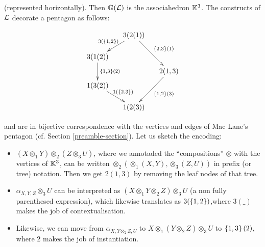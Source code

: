  \noindent
 (represented horizontally).  Then ${\mathbb G}({\cal L})$ is the associahedron ${\mathbb K}^3$. The constructs of
  ${\cal L}$ decorate a pentagon as follows:

\begin{center}
$$\xymatrix @-1.65pc {&& 3(2(1)) \ar @{->}[ddll]_{3(\set{1,2})} \ar @{->}[dddrr]^{\set{2,3}(1)}&& \\
 &&&&\\
3(1(2))   \ar @{->}[dd]^{\set{1,3}(2)}&&   && \\
 &&&&2(1,3) \ar @{->}[dddll]^{\set{1,2}(3)}\\
 1(3(2)) \ar @{->}[ddrr]^{1(\set{2,3})} &  &\\
 &&&&\\
 &&1(2(3))&&}$$
\end{center}
and are in bijective correspondence with the vertices and edges of Mac Lane's pentagon (cf. Section \ref{preamble-section}). 
  Let us sketch the encoding:
  \begin{itemize}
  \item $(X\otimes_1 Y)\otimes_2 (Z\otimes_3 U)$, where we annotaded the ``compositions'' $\otimes$ with the vertices of ${\mathbb K}^3$, can be written $\otimes_2(\otimes_1(X,Y),\otimes_3(Z,U))$ in prefix (or tree) notation. Then we get 
 $2(1,3)$ by removing the leaf nodes of that tree.
 \item $\alpha_{X,Y,Z}\otimes_3 U$ can be interpreted as $(X\otimes_1 Y\otimes_2 Z)\otimes_3 U$ (a non fully parenthesed expression), which likewise 
 translates as $3(\left\{1,2\right\})$,where $3(\_)$ makes the job of contextualisation.
 \item Likewise, we can move from
$\alpha_{X,Y\otimes_2 Z,U}$ to $X\otimes_1(Y\otimes_2 Z)\otimes_3 U$ to $\left\{1,3\right\}(2)$, where $2$ makes the job of instantiation.
\end{itemize}

